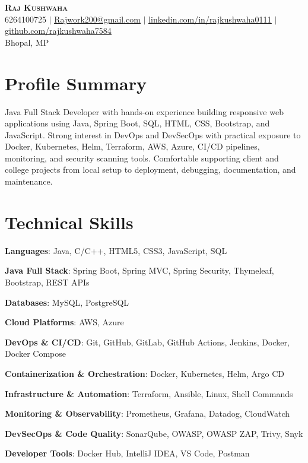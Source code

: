 \documentclass[letterpaper,11pt]{article}
\begin{document}
\begin{center}
    {\Huge \textbf{\scshape Raj Kushwaha}} \\ \vspace{2pt}
    \small 6264100725 $|$
    \href{mailto:Rajwork200@gmail.com}{\underline{Rajwork200@gmail.com}} $|$
    \href{https://www.linkedin.com/in/rajkushwaha0111/}{\underline{linkedin.com/in/rajkushwaha0111}} $|$
    \href{https://github.com/rajkushwaha7584}{\underline{github.com/rajkushwaha7584}} \\
    \small Bhopal, MP
\end{center}

\section{Profile Summary}
\small{
Java Full Stack Developer with hands-on experience building responsive web applications using Java, Spring Boot, SQL, HTML, CSS, Bootstrap, and JavaScript. Strong interest in DevOps and DevSecOps with practical exposure to Docker, Kubernetes, Helm, Terraform, AWS, Azure, CI/CD pipelines, monitoring, and security scanning tools. Comfortable supporting client and college projects from local setup to deployment, debugging, documentation, and maintenance.
}
\vspace{-4pt}

\section{Technical Skills}
\begin{itemize}[leftmargin=0.15in, label={}]
\small{
\item \textbf{Languages}{: Java, C/C++, HTML5, CSS3, JavaScript, SQL}
\item \textbf{Java Full Stack}{: Spring Boot, Spring MVC, Spring Security, Thymeleaf, Bootstrap, REST APIs}
\item \textbf{Databases}{: MySQL, PostgreSQL}
\item \textbf{Cloud Platforms}{: AWS, Azure}
\item \textbf{DevOps \& CI/CD}{: Git, GitHub, GitLab, GitHub Actions, Jenkins, Docker, Docker Compose}
\item \textbf{Containerization \& Orchestration}{: Docker, Kubernetes, Helm, Argo CD}
\item \textbf{Infrastructure \& Automation}{: Terraform, Ansible, Linux, Shell Commands}
\item \textbf{Monitoring \& Observability}{: Prometheus, Grafana, Datadog, CloudWatch}
\item \textbf{DevSecOps \& Code Quality}{: SonarQube, OWASP, OWASP ZAP, Trivy, Snyk}
\item \textbf{Developer Tools}{: Docker Hub, IntelliJ IDEA, VS Code, Postman}
}
\end{itemize}
\end{document}
